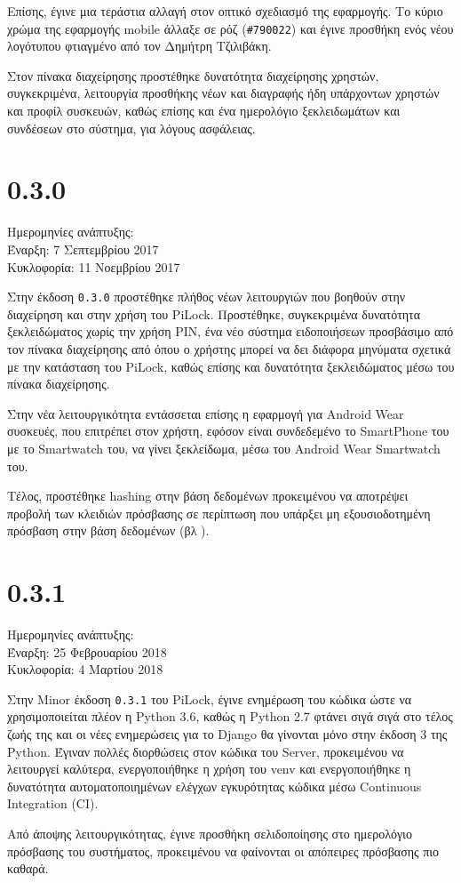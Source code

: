 	Επίσης, έγινε μια τεράστια αλλαγή στον οπτικό σχεδιασμό της εφαρμογής. Το κύριο χρώμα της εφαρμογής mobile άλλαξε σε ρόζ (\verb|#790022|) και έγινε προσθήκη ενός νέου λογότυπου φτιαγμένο από τον Δημήτρη Τζιλιβάκη.

	Στον πίνακα διαχείρησης προστέθηκε δυνατότητα διαχείρησης χρηστών, συγκεκριμένα, λειτουργία προσθήκης νέων και διαγραφής ήδη υπάρχοντων χρηστών και προφίλ συσκευών, καθώς επίσης και ένα ημερολόγιο ξεκλειδωμάτων και συνδέσεων στο σύστημα, για λόγους ασφάλειας.  

\section{0.3.0}
	Ημερομηνίες ανάπτυξης:\\Έναρξη: 7 Σεπτεμβρίου 2017\\Κυκλοφορία: 11 Νοεμβρίου 2017

	Στην έκδοση \verb|0.3.0| προστέθηκε πλήθος νέων λειτουργιών που βοηθούν στην διαχείρηση και στην χρήση του PiLock. Προστέθηκε, συγκεκριμένα δυνατότητα ξεκλειδώματος χωρίς την χρήση PIN, ένα νέο σύστημα ειδοποιήσεων προσβάσιμο από τον πίνακα διαχείρησης από όπου ο χρήστης μπορεί να δει διάφορα μηνύματα σχετικά με την κατάσταση του PiLock, καθώς επίσης και δυνατότητα ξεκλειδώματος μέσω του πίνακα διαχείρησης.

	Στην νέα λειτουργικότητα εντάσσεται επίσης η εφαρμογή για Android Wear συσκευές, που επιτρέπει στον χρήστη, εφόσον είναι συνδεδεμένο το SmartPhone του με το Smartwatch του, να γίνει ξεκλείδωμα, μέσω του Android Wear Smartwatch του.

	Τέλος, προστέθηκε hashing στην βάση δεδομένων προκειμένου να αποτρέψει προβολή των κλειδιών πρόσβασης σε περίπτωση που υπάρξει μη εξουσιοδοτημένη πρόσβαση στην βάση δεδομένων (βλ ). 

\section{0.3.1}
	Ημερομηνίες ανάπτυξης:\\Έναρξη: 25 Φεβρουαρίου 2018\\Κυκλοφορία: 4 Μαρτίου 2018

	Στην Minor έκδοση \verb|0.3.1| του PiLock, έγινε ενημέρωση του κώδικα ώστε να χρησιμοποιείται πλέον η Python 3.6, καθώς η Python 2.7 φτάνει σιγά σιγά στο τέλος ζωής της και οι νέες ενημερώσεις για το Django θα γίνονται μόνο στην έκδοση 3 της Python. Έγιναν πολλές διορθώσεις στον κώδικα του Server, προκειμένου να λειτουργεί καλύτερα, ενεργοποιήθηκε η χρήση του venv και ενεργοποιήθηκε η δυνατότητα αυτοματοποιημένων ελέγχων εγκυρότητας κώδικα μέσω Continuous Integration (CI).

	Από άποψης λειτουργικότητας, έγινε προσθήκη σελιδοποίησης στο ημερολόγιο πρόσβασης του συστήματος, προκειμένου να φαίνονται οι απόπειρες πρόσβασης πιο καθαρά.
